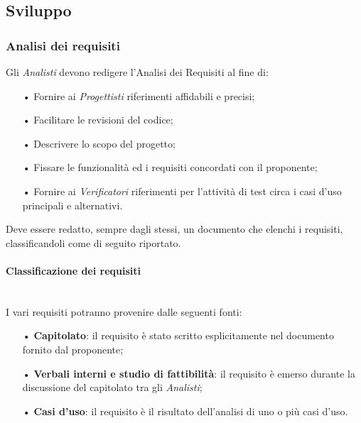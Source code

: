 \subsection{Sviluppo}
\subsubsection{Analisi dei requisiti}
Gli \textit{Analisti} devono redigere l'Analisi dei Requisiti al fine di:
\begin{itemize}
    \item[•] Fornire ai \textit{Progettisti} riferimenti affidabili e precisi;
    \item[•] Facilitare le revisioni del codice;
    \item[•] Descrivere lo scopo del progetto;
    \item[•] Fissare le funzionalità ed i requisiti concordati con il proponente;
    \item[•] Fornire ai \textit{Verificatori} riferimenti per l'attività di test circa i casi d'uso principali e alternativi.
\end{itemize}

Deve essere redatto, sempre dagli stessi, un documento che elenchi i requisiti, classificandoli come di seguito riportato.

\paragraph{Classificazione dei requisiti}\mbox{}\\
I vari {requisiti} potranno provenire dalle seguenti fonti:
\begin{itemize}
    \item[•] \textbf{Capitolato}: il requisito è stato scritto esplicitamente nel documento fornito dal proponente;
    \item[•] \textbf{Verbali interni e studio di fattibilità}: il requisito è emerso durante la discussione del capitolato tra gli \textit{Analisti};
    \item[•] \textbf{Casi d'uso}: il requisito è il risultato dell'analisi di uno o più casi d'uso.
\end{itemize}

